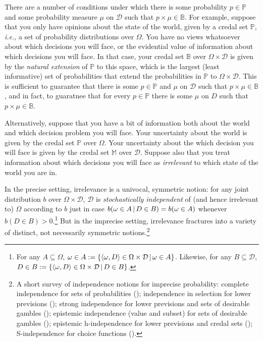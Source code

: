 \documentclass[a4paper]{article}
\newcommand\D{\mathcal{D}}
\renewcommand\P{\mathbb{P}} %
\newcommand{\IB}{\mathbb{B}}
\newcommand{\ID}{\mathbb{M}}
\newcommand{\IP}{\P}
\newcommand{\pb}{b}
\renewcommand{\color}[1]{}
\newcommand\SetDelimiter[1][]{
	\nonscript\,#1\vert \allowbreak \nonscript\,\mathopen{}}
\providecommand\given{\SetDelimiter}
\newenvironment{CCM rewritten}
{\begingroup\color{blue}} %
{\endgroup}              %
\begin{document}
 {\color{red} There are a number of conditions under which there is some probability $p\in\IP$ and some probability measure $\mu$ on $\D$ such that $p\times\mu\in \IB$. For example, suppose that you only have opinions about the state of the world, given by a credal set $\IP$, \textit{i.e.}, a set of probability distributions over $\Omega$. You have no views whatsoever about which decisions you will face, or the evidential value of information about which decisions you will face. In that case, your credal set $\IB$ over $\Omega \times \D$ is given by the \textit{natural extension} of $\IP$ to this space, which is the largest (least informative) set of probabilities that extend the probabilities in $\IP$ to $\Omega \times \D$. This is sufficient to guarantee that there is some $p\in\IP$ and $\mu$ on $\D$ such that $p\times\mu\in \IB$, and in fact, to guaratnee that for every $p\in \IP$ there is some $\mu$ on  $D$ such that $p\times\mu\in\IB$. 
 
 
Alternatively, suppose that you have a bit of information both about the world and which decision problem you will face. Your uncertainty about the world is given by the credal set $\IP$ over $\Omega$. Your uncertainty about the which decision you will face is given by the credal set $\ID$ over $\D$. Suppose also that you treat information about which decisions you will face as \textit{irrelevant} to which state of the world you are in. 

In the precise setting, irrelevance is a univocal, symmetric notion: for any joint distribution $\pb$ over $\Omega \times \D$, $\D$ is \textit{stochastically independent} of (and hence irrelevant to) $\Omega$ according to $\pb$ just in case $\pb(\omega\in A\given D\in B)=\pb(\omega\in A)$ whenever $\pb(D\in B)>0$.\footnote{For any $A\subseteq\Omega$, $\omega\in A:=\left\{\left<\omega,D\right>\in\Omega\times\D\given \omega\in A\right\}$. Likewise, for any $B\subseteq\D$, $D\in B:=\left\{\left<\omega,D\right>\in\Omega\times\D\given D\in B\right\}$.} But in the imprecise setting, irrelevance fractures into a variety of distinct, not necessarily symmetric notions.\footnote{A short survey of independence notions for imprecise probability: complete independence for sets of probabilities (\cite{seidenfeld2007ci,cozman2012}); independence in selection for lower previsions (\cite{campos1995}); strong independence for lower previsions and sets of desirable gambles (\cite{cooman:2012:indnatexdesirs}); epistemic independence (value and subset) for sets of desirable gambles (\cite{Moral2005b}); epistemic h-independence for lower previsions and credal sets (\cite{debock2015:phdthesis}); S-independence for choice functions (\cite{debock2021:S-independence}).}

}
\end{document}
